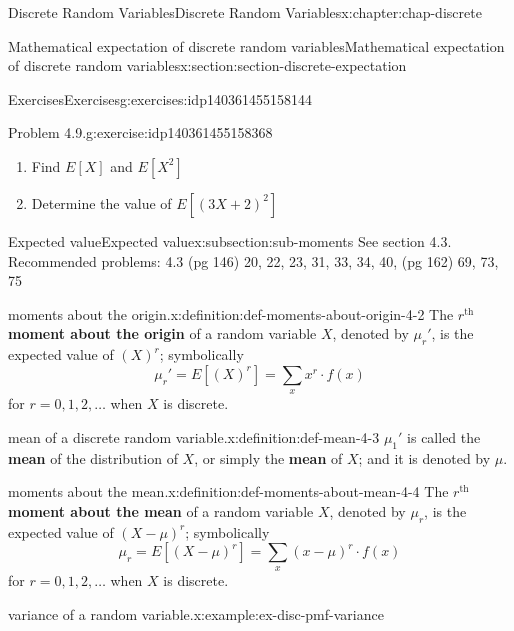 \documentclass[oneside,10pt,]{book}
\newcommand{\terminology}[1]{\textbf{#1}}
\numberwithin{equation}{section}
\begin{document}
\begin{chapterptx}{Discrete Random Variables}{}{Discrete Random Variables}{}{}{x:chapter:chap-discrete}
\begin{sectionptx}{Mathematical expectation of discrete random variables}{}{Mathematical expectation of discrete random variables}{}{}{x:section:section-discrete-expectation}
\begin{exercises-subsection}{Exercises}{}{Exercises}{}{}{g:exercises:idp140361455158144}
\begin{divisionexercise}{1}{Problem 4.9.}{}{g:exercise:idp140361455158368}
\)%
\begin{enumerate}[label=(\alph*)]
\item{}Find \(E[X]\) and \(E[X^2]\)%
\item{}Determine the value of \(E[(3X + 2)^2]\)%
\end{enumerate}
%
\end{divisionexercise}%
\end{exercises-subsection}
%
%
\typeout{************************************************}
\typeout{************************************************}
%
\begin{subsectionptx}{Expected value}{}{Expected value}{}{}{x:subsection:sub-moments}
See section 4.3. Recommended problems: 4.3 (pg 146) 20, 22, 23, 31, 33, 34, 40, (pg 162) 69, 73, 75%
\begin{definition}{moments about the origin.}{x:definition:def-moments-about-origin-4-2}%
The \(\displaystyle r^\text{th}\) \terminology{moment about the origin} of a random variable \(X\), denoted by \(\displaystyle \mu_r'\), is the expected value of \(\displaystyle
(X)^r\); symbolically%
\begin{equation*}
\mu_r'=E[(X)^r] = \sum_x x^r\cdot f(x)
\end{equation*}
for \(\displaystyle r =
0,1,2, \dots\) when \(X\) is discrete.%
\end{definition}
\begin{definition}{mean of a discrete random variable.}{x:definition:def-mean-4-3}%
\(\displaystyle \mu_1'\) is called the \terminology{mean} of the distribution of \(X\), or simply the \terminology{mean} of \(X\); and it is denoted by \(\displaystyle
\mu\).\end{definition}
\begin{definition}{moments about the mean.}{x:definition:def-moments-about-mean-4-4}%
The \(\displaystyle r^\text{th}\) \terminology{moment about the mean} of a random variable \(X\), denoted by \(\displaystyle \mu_r\), is the expected value of \(\displaystyle
(X-\mu)^r\); symbolically%
\begin{equation*}
\mu_r=E[(X-\mu)^r] = \sum_x (x-\mu)^r\cdot f(x)
\end{equation*}
for \(\displaystyle r =
0,1,2, \dots\) when \(X\) is discrete.%
\end{definition}
\begin{example}{variance of a random variable.}{x:example:ex-disc-pmf-variance}%

\end{example}
\end{subsectionptx}
\end{sectionptx}
\end{chapterptx}
\end{document}
